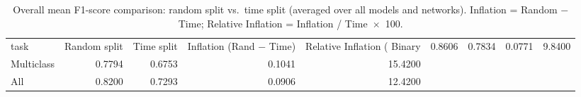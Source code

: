 \begin{table}
\caption{Overall mean F1-score comparison: random split vs.\ time split (averaged over all models and networks). Inflation = Random $-$ Time; Relative Inflation = Inflation / Time~$\times$~100.}
\label{tab:q2_overall}
\begin{tabular}{lrrrr}
\toprule
task & Random split & Time split & Inflation (Rand − Time) & Relative Inflation (%
\midrule
Binary & 0.8606 & 0.7834 & 0.0771 & 9.8400 \\
Multiclass & 0.7794 & 0.6753 & 0.1041 & 15.4200 \\
All & 0.8200 & 0.7293 & 0.0906 & 12.4200 \\
\bottomrule
\end{tabular}
\end{table}
